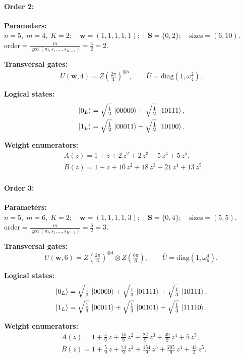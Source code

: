 \documentclass[pdflatex,sn-nature]{sn-jnl}%
\theoremstyle{thmstyleone}%
\theoremstyle{thmstyletwo}%
\theoremstyle{thmstylethree}%
\begin{document}
\begin{appendices}
\paragraph{\textbf{Order 2:}}
\noindent\textbf{Parameters:} $n=5,\; m=4,\; K=2;\quad \mathbf w=(1, 1, 1, 1, 1);\quad \mathbf S=\{0, 2\};\quad \text{sizes}=\left(6, 10\right).$ $\displaystyle \text{order}=\frac{m}{\gcd(m,s_1,\dots,s_{K-1})}=\frac{4}{2}=2.$

\noindent\textbf{Transversal gates:}
\[
    U(\mathbf w,4)=Z \left(\tfrac{2\pi}{4}\right)^{\otimes5},\qquad
    \overline U=\mathrm{diag}(1,\omega_4^{2}).
\]

\noindent\textbf{Logical states:}
\begin{align*}
    &\ket{0_L} = \sqrt{\tfrac{1}{2}}\,\ket{00000} + \sqrt{\tfrac{1}{2}}\,\ket{10111}, \\
    &\ket{1_L} = \sqrt{\tfrac{1}{2}}\,\ket{00011} + \sqrt{\tfrac{1}{2}}\,\ket{10100}.
\end{align*}

\noindent\textbf{Weight enumerators:}
\begin{align*}
    &A(z) = 1 + z + 2\,z^{2} + 2\,z^{3} + 5\,z^{4} + 5\,z^{5}, \\
    &B(z) = 1 + z + 10\,z^{2} + 18\,z^{3} + 21\,z^{4} + 13\,z^{5}.
\end{align*}

\paragraph{\textbf{Order 3:}}
\noindent\textbf{Parameters:} $n=5,\; m=6,\; K=2;\quad \mathbf w=(1, 1, 1, 1, 3);\quad \mathbf S=\{0, 4\};\quad \text{sizes}=\left(5, 5\right).$ $\displaystyle \text{order}=\frac{m}{\gcd(m,s_1,\dots,s_{K-1})}=\frac{6}{2}=3.$

\noindent\textbf{Transversal gates:}
\[
    U(\mathbf w,6)=Z \left(\tfrac{2\pi}{6}\right)^{\otimes4} \otimes Z \left(\tfrac{6\pi}{6}\right),\qquad
    \overline U=\mathrm{diag}(1,\omega_6^{4}).
\]

\noindent\textbf{Logical states:}
\begin{align*}
    &\ket{0_L} = \sqrt{\tfrac{1}{3}}\,\ket{00000} + \sqrt{\tfrac{1}{3}}\,\ket{01111} + \sqrt{\tfrac{1}{3}}\,\ket{10111}, \\
    &\ket{1_L} = \sqrt{\tfrac{1}{3}}\,\ket{00011} + \sqrt{\tfrac{1}{3}}\,\ket{00101} + \sqrt{\tfrac{1}{3}}\,\ket{11110}.
\end{align*}

\noindent\textbf{Weight enumerators:}
\begin{align*}
    &A(z) = 1 + \tfrac{5}{9}\,z + \tfrac{14}{9}\,z^{2} + \tfrac{22}{9}\,z^{3} + \tfrac{49}{9}\,z^{4} + 5\,z^{5}, \\
    &B(z) = 1 + \tfrac{5}{9}\,z + \tfrac{74}{9}\,z^{2} + \tfrac{154}{9}\,z^{3} + \tfrac{205}{9}\,z^{4} + \tfrac{43}{3}\,z^{5}. 
\end{align*}


\end{appendices}
\end{document}
